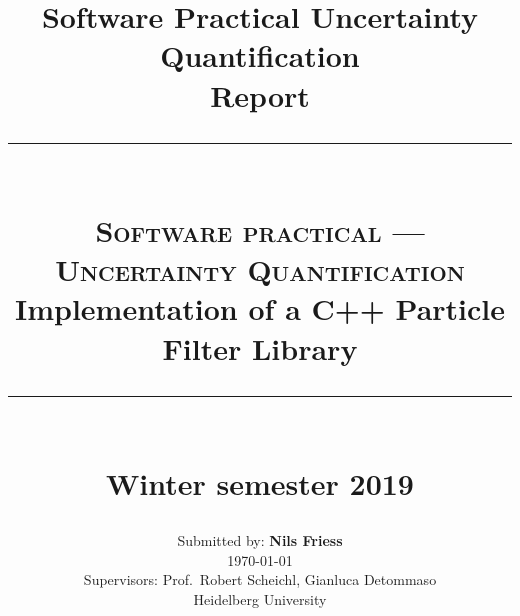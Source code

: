 \documentclass[
fontsize=11pt,
paper=a4,
numbers=noenddot,
parskip=half,
div=13
]{scrartcl}
\title{{\normalsize Software Practical Uncertainty Quantification}\\Report}
\newcommand{\HRule}{\rule{.9\linewidth}{.6pt}}
\begin{document}
 
\title{ \normalsize
  \HRule\\[0.5cm]
  \large \textsc{Software practical --- Uncertainty Quantification}\\
  \LARGE {Implementation of a C++ Particle Filter Library}\\
  \HRule\\[0.5cm]
  \normalsize Winter semester 2019 \vfill }

\date{}

\author{ \large
  Submitted by: \textbf{Nils Friess}\\
  {\small\today}\\[3ex]
  \normalsize
  Supervisors: Prof.\ Robert Scheichl, Gianluca Detommaso \\
  \normalsize Heidelberg University }

\clearpage\maketitle
\thispagestyle{empty}
\newpage
\setcounter{page}{1}





 
\printbibliography
\end{document}
